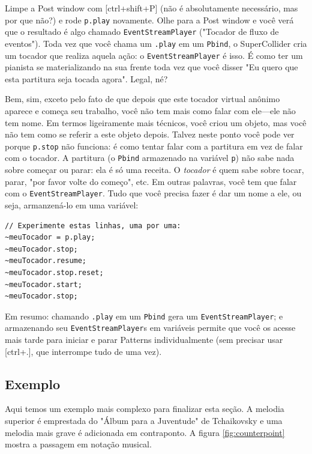 Limpe a Post window com [ctrl+shift+P] (não é absolutamente necessário, mas por que não?) e rode \texttt{p.play} novamente. Olhe para a Post window e você verá que o resultado é algo chamado  \texttt{EventStreamPlayer} ("Tocador de fluxo de eventos"). Toda vez que você chama um \texttt{.play} em um \texttt{Pbind}, o SuperCollider cria um tocador que realiza aquela ação: o \texttt{EventStreamPlayer} é isso. É como ter um pianista se materializando na sua frente toda vez que você disser "Eu quero que esta partitura seja tocada agora". Legal, né?


Bem, sim, exceto pelo fato de que depois que este tocador virtual anônimo aparece e começa seu trabalho, você não tem mais como falar com ele---ele não tem nome. Em termos ligeiramente mais técnicos, você criou um objeto, mas você não tem como se referir a este objeto depois. Talvez neste ponto você pode ver porque \texttt{p.stop} não funciona: é como tentar falar com a partitura em vez de falar com o tocador. A partitura (o \texttt{Pbind} armazenado na variável \texttt{p}) não sabe nada sobre começar ou parar: ela é só uma receita. O \emph{tocador} é quem sabe sobre tocar, parar, "por favor volte do começo", etc. Em outras palavras, você tem que falar com o \texttt{EventStreamPlayer}. Tudo que você precisa fazer é dar um nome a ele, ou seja, armanzená-lo em uma variável:

 
\begin{lstlisting}[style=SuperCollider-IDE, basicstyle=\scttfamily\footnotesize]
// Experimente estas linhas, uma por uma:
~meuTocador = p.play;
~meuTocador.stop;
~meuTocador.resume;
~meuTocador.stop.reset;
~meuTocador.start;
~meuTocador.stop;
\end{lstlisting}
 

Em resumo: chamando \texttt{.play} em um \texttt{Pbind} gera um \texttt{EventStreamPlayer}; e armazenando seu \texttt{EventStreamPlayer}s em variáveis permite que você os acesse mais tarde para iniciar e parar Patterns individualmente (sem precisar usar [ctrl+.], que interrompe tudo de uma vez).

\subsection{Exemplo}

Aqui temos um exemplo mais complexo para finalizar esta seção. A melodia superior é emprestada do "Álbum para a Juventude" de Tchaikovsky e uma melodia mais grave é adicionada em contraponto. A figura \ref{fig:counterpoint} mostra a passagem em notação musical.
 

